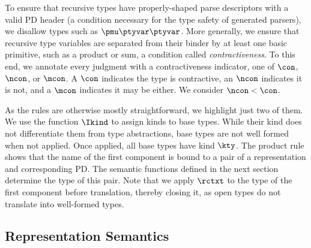 To ensure that recursive types have properly-shaped parse descriptors
with a valid PD header (a condition necessary for the type safety of
generated parsers), we disallow types such as $\pmu \ptyvar
\ptyvar$. More generally, we ensure that
recursive type variables are separated from their binder by at least
one basic primitive, such as a product or sum, a condition called {\it contractiveness}. To this end, we annotate every judgment with a contractiveness
indicator, one of $\con$, $\ncon$, or $\mcon$. A
$\con$ indicates the type is contractive, an $\ncon$
indicates it is not, and a $\mcon$ indicates it may be either. 
We consider $\ncon < \con$. 

As the rules are otherwise mostly straightforward, we highlight
just two of them. We use the function $\Ikind$ to assign kinds to base types.
While their kind does not differentiate them from type
abstractions, base types are not well formed when not applied.  
Once applied, all base types have kind $\kty$. The product rule
shows that the name of the first component is bound to a pair of a representation and corresponding PD.
The semantic functions defined in the next section determine the type of this pair.
Note that we apply $\rctxt$ to the type of the first component before
translation, thereby closing it,
 as open \ddc{}
types do not translate into well-formed \implang{} types.

\subsection{Representation Semantics}
\label{sec:intty-sem}


